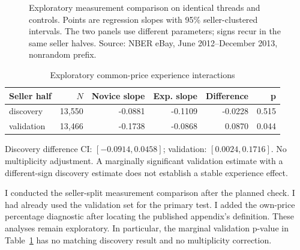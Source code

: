 \documentclass[11pt,a4paper]{article}
\begin{document}
\begin{figure}[htbp]
\begin{minipage}{.49\linewidth}
\end{minipage}
\caption{Exploratory measurement comparison on identical threads and controls.
Points are regression slopes with 95\% seller-clustered intervals. The two
panels use different parameters; signs recur in the same seller halves.
Source: NBER eBay, June 2012--December 2013, nonrandom prefix.}
\label{fig:measure}\end{figure}
\begin{table}[htbp]
\centering\small
\caption{Exploratory common-price experience interactions}\label{tab:extra}
\begin{tabular}{lrrrrr}
\toprule
Seller half & $N$ & Novice slope & Exp. slope & Difference & p \\
\midrule
discovery & 13,550 & -0.0881 & -0.1109 & -0.0228 & 0.515 \\
validation & 13,466 & -0.1738 & -0.0868 & 0.0870 & 0.044 \\
\bottomrule
\end{tabular}
\par\vspace{4pt}\begin{minipage}{\linewidth}\footnotesize Discovery difference CI: $[-0.0914,0.0458]$; validation: $[0.0024,0.1716]$. No multiplicity adjustment. A marginally significant validation estimate with a different-sign discovery estimate does not establish a stable experience effect.\end{minipage}
\end{table}

I conducted the seller-split measurement comparison after the planned check.
I had already used the validation set for the primary test. I added the own-price
percentage diagnostic after locating the published appendix's definition. These analyses remain exploratory. In particular, the marginal
validation p-value in Table~\ref{tab:extra} has no matching discovery result
and no multiplicity correction.
\end{document}
